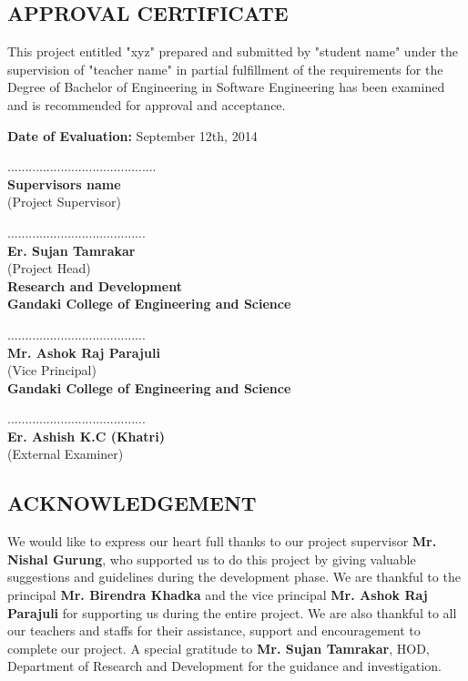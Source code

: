 \documentclass[a4paper, 14pt]{report}
\begin{document}
	\begin{description}
	
		\begin{center}
			\section*{APPROVAL CERTIFICATE}
		\end{center}
		This project entitled "xyz" prepared and submitted by "student name" under
the supervision of "teacher name" in partial fulfillment of the requirements for
the Degree of Bachelor of Engineering in Software Engineering has been
examined and is recommended for approval and acceptance.
\vskip0.1cm


	\textbf{Date of Evaluation:} September 12th, 2014
	\vskip0.5cm
	

	.......................................... \\
	\textbf{Supervisors name} \\
	(Project Supervisor)
	\vskip0.3cm
	
		....................................... \\
\textbf{Er. Sujan Tamrakar} \\
(Project Head) \\
\textbf{Research and Development} \\
\textbf{Gandaki College of Engineering and Science}
\vskip0.3cm

....................................... \\
\textbf{Mr. Ashok Raj Parajuli} \\
(Vice Principal) \\
\textbf{Gandaki College of Engineering and Science}
\vskip0.3cm

....................................... \\
\textbf{Er. Ashish K.C (Khatri)} \\
(External Examiner) \\

	\newpage
	\begin{center}
		\section*{ACKNOWLEDGEMENT}
	\end{center}
	
	We would like to express our heart full thanks to our project supervisor
\textbf{Mr. Nishal Gurung}, who supported us to do this project by giving
valuable suggestions and guidelines during the development phase. We are
thankful to the principal \textbf{Mr. Birendra Khadka} and the vice principal \textbf{Mr. Ashok Raj Parajuli} for supporting us during the entire project. We are also thankful to all our teachers and staffs for their assistance, support and encouragement to complete our project. A special gratitude to \textbf{Mr. Sujan Tamrakar}, HOD, Department of Research and Development for the
guidance and investigation.


\end{description}
\end{document}
